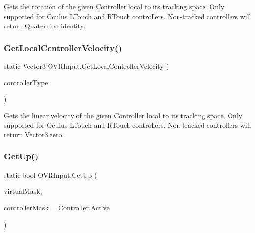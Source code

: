 Gets the rotation of the given Controller local to its tracking space. Only supported for Oculus L\+Touch and R\+Touch controllers. Non-\/tracked controllers will return Quaternion.\+identity. 

\mbox{\label{class_o_v_r_input_a284d11ad0469f2b1e04447e2d6a26bd4}} 
\subsubsection{\texorpdfstring{Get\+Local\+Controller\+Velocity()}{GetLocalControllerVelocity()}}
{\footnotesize\ttfamily static Vector3 O\+V\+R\+Input.\+Get\+Local\+Controller\+Velocity (\begin{DoxyParamCaption}\item[{\mbox{\hyperlink{class_o_v_r_input_a5c86f9052a9cbb0b73779ff5704d60a8}{O\+V\+R\+Input.\+Controller}}}]{controller\+Type }\end{DoxyParamCaption})\hspace{0.3cm}{\ttfamily [static]}}



Gets the linear velocity of the given Controller local to its tracking space. Only supported for Oculus L\+Touch and R\+Touch controllers. Non-\/tracked controllers will return Vector3.\+zero. 

\mbox{\label{class_o_v_r_input_a27ab53793953a2222097e5664852c6ad}} 
\subsubsection{\texorpdfstring{Get\+Up()}{GetUp()}\hspace{0.1cm}{\footnotesize\ttfamily [1/6]}}
{\footnotesize\ttfamily static bool O\+V\+R\+Input.\+Get\+Up (\begin{DoxyParamCaption}\item[{\mbox{\hyperlink{class_o_v_r_input_aed3cf5b4b5e0669cea0941f61e018ee5}{Button}}}]{virtual\+Mask,  }\item[{\mbox{\hyperlink{class_o_v_r_input_a5c86f9052a9cbb0b73779ff5704d60a8}{Controller}}}]{controller\+Mask = {\ttfamily \mbox{\hyperlink{class_o_v_r_input_a5c86f9052a9cbb0b73779ff5704d60a8a4d3d769b812b6faa6b76e1a8abaece2d}{Controller.\+Active}}} }\end{DoxyParamCaption})\hspace{0.3cm}{\ttfamily [static]}}



